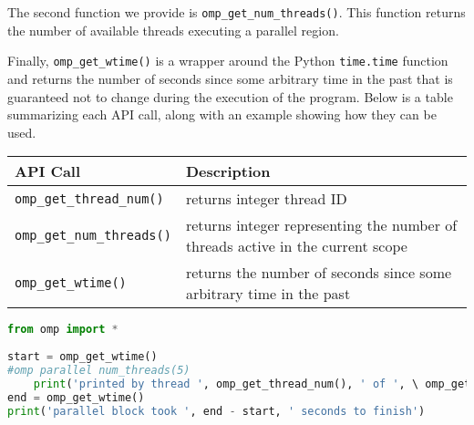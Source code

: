 \documentclass[letterpaper,12pt]{article} %
\begin{document}
The second function we provide is \texttt{omp\_get\_num\_threads()}. This function returns the number of available threads executing a parallel region.

Finally, \texttt{omp\_get\_wtime()} is a wrapper around the Python \texttt{time.time} function and returns the number of seconds since some arbitrary time in the past that is guaranteed not to change during the execution of the program. Below is a table summarizing each API call, along with an example showing how they can be used.

\begin{center}
\begin{tabular}{ | p{5cm} | p{9cm} | }
\hline
\textbf{API Call} & \textbf{Description} \\
\hline
 \texttt{omp\_get\_thread\_num()} & returns integer thread ID \\ 
 \hline
 \texttt{omp\_get\_num\_threads()} & returns integer representing the number of threads active in the current scope\\  
 \hline
 \texttt{omp\_get\_wtime()} & returns the number of seconds since some arbitrary time in the past \\   
 \hline
\end{tabular}
\end{center}

 \begin{lstlisting}[language=Python]
from omp import *
 
start = omp_get_wtime()
#omp parallel num_threads(5)
	print('printed by thread ', omp_get_thread_num(), ' of ', \ omp_get_num_threads())
end = omp_get_wtime()
print('parallel block took ', end - start, ' seconds to finish')
\end{lstlisting}
\end{document}
